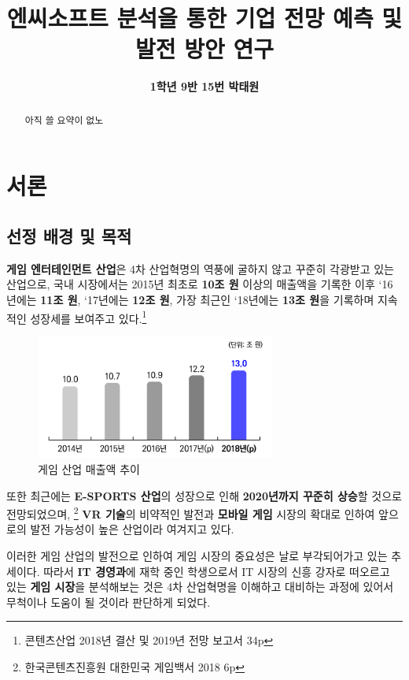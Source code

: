 \documentclass[11pt]{oblivoir}
\title{\textbf{엔씨소프트 분석을 통한 기업 전망 예측 및 발전 방안 연구}}
\author{\textbf{1학년 9반 15번 박태원}}
\begin{document}
	\begin{center}
		\maketitle
		\begin{abstract}
			아직 쓸 요약이 없노
		\end{abstract}
		\tableofcontents
		\pagebreak
	\end{center}
	
	
	\section{서론}
		\subsection{선정 배경 및 목적}
			\textbf{게임 엔터테인먼트 산업}은 4차 산업혁명의 역풍에 굴하지 않고 꾸준히 각광받고 있는 산업으로, 국내 시장에서는 2015년 최초로 \textbf{10조 원} 이상의 매출액을 기록한 이후 `16년에는 \textbf{11조 원}, `17년에는 \textbf{12조 원}, 가장 최근인 `18년에는 \textbf{13조 원}을 기록하며 지속적인 성장세를 보여주고 있다.\footnote{콘텐츠산업 2018년 결산 및 2019년 전망 보고서 34p}
			
			\begin{figure}[htbp]
				\centering
				\includegraphics[width=0.7\textwidth]{Pictures/GameMaechul.png}
				\caption{게임 산업 매출액 추이}
			\end{figure}
			
			또한 최근에는 \textbf{E-SPORTS 산업}의 성장으로 인해 \textbf{2020년까지 꾸준히 상승}할 것으로 전망되었으며, \footnote{한국콘텐츠진흥원 대한민국 게임백서 2018 6p} 
			\textbf{VR 기술}의 비약적인 발전과 \textbf{모바일 게임} 시장의 확대로 인하여 앞으로의 발전 가능성이 높은 산업이라 여겨지고 있다.
			
			이러한 게임 산업의 발전으로 인하여 게임 시장의 중요성은 날로 부각되어가고 있는 추세이다. 따라서 \textbf{IT 경영과}에 재학 중인 학생으로서 IT 시장의 신흥 강자로 떠오르고 있는 \textbf{게임 시장}을 분석해보는 것은 4차 산업혁명을 이해하고 대비하는 과정에 있어서 무척이나 도움이 될 것이라 판단하게 되었다.
			
\end{document}
